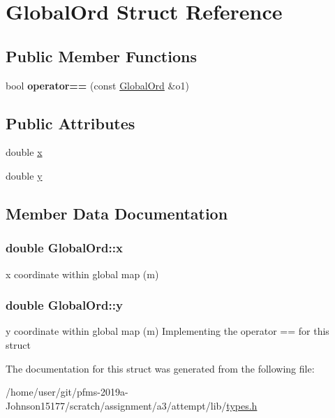 \hypertarget{structGlobalOrd}{}\section{Global\+Ord Struct Reference}
\label{structGlobalOrd}
\subsection*{Public Member Functions}
\begin{DoxyCompactItemize}
\item 
bool {\bfseries operator==} (const \hyperlink{structGlobalOrd}{Global\+Ord} \&o1)\hypertarget{structGlobalOrd_a58aa85821a795e025b0e72463dec2bbb}{}\label{structGlobalOrd_a58aa85821a795e025b0e72463dec2bbb}

\end{DoxyCompactItemize}
\subsection*{Public Attributes}
\begin{DoxyCompactItemize}
\item 
double \hyperlink{structGlobalOrd_a59539a3081973edb2ec3789f71943923}{x}
\item 
double \hyperlink{structGlobalOrd_af9f9e1597f7373a92ce693c10acec8a5}{y}
\end{DoxyCompactItemize}


\subsection{Member Data Documentation}
\subsubsection[{\texorpdfstring{x}{x}}]{\setlength{\rightskip}{0pt plus 5cm}double Global\+Ord\+::x}\hypertarget{structGlobalOrd_a59539a3081973edb2ec3789f71943923}{}\label{structGlobalOrd_a59539a3081973edb2ec3789f71943923}
x coordinate within global map (m) 
\subsubsection[{\texorpdfstring{y}{y}}]{\setlength{\rightskip}{0pt plus 5cm}double Global\+Ord\+::y}\hypertarget{structGlobalOrd_af9f9e1597f7373a92ce693c10acec8a5}{}\label{structGlobalOrd_af9f9e1597f7373a92ce693c10acec8a5}
y coordinate within global map (m) Implementing the operator \textquotesingle{}==\textquotesingle{} for this struct 

The documentation for this struct was generated from the following file\+:\begin{DoxyCompactItemize}
\item 
/home/user/git/pfms-\/2019a-\/\+Johnson15177/scratch/assignment/a3/attempt/lib/\hyperlink{types_8h}{types.\+h}\end{DoxyCompactItemize}
